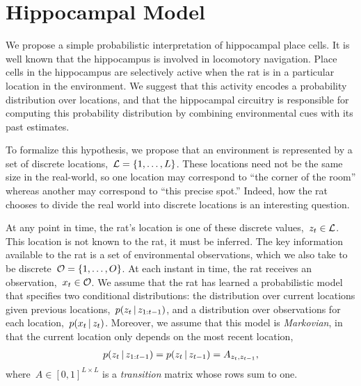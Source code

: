 \section{Hippocampal Model}
We propose a simple probabilistic interpretation of hippocampal place cells.
It is well known that the hippocampus is involved in locomotory navigation.
Place cells in the hippocampus are selectively active when the rat is 
in a particular location in the environment. We suggest that this activity 
encodes a probability distribution over locations, and that the hippocampal 
circuitry is responsible for computing this probability distribution by 
combining environmental cues with its past estimates. 

To formalize this hypothesis, we propose that an environment is represented 
by a set of discrete locations,~${\mathcal{L} = \{1, \ldots, L\}}$. These locations 
need not be the same size in the real-world, so one location may correspond to
``the corner of the room'' whereas another may correspond to ``this precise 
spot.'' Indeed, how the rat chooses to divide the real world into discrete 
locations is an interesting question.

At any point in time, 
the rat's location is one of these discrete values,~${z_t \in \mathcal{L}}$. 
This location is not known to the rat, it must be inferred. 
The key information available to the rat is a set of environmental observations,
which we also take to be discrete~${\mathcal{O} = \{1, \ldots, O\}}$. At 
each instant in time, the rat receives an observation,~${x_t \in \mathcal{O}}$. 
We assume that the rat has learned a probabilistic model that specifies 
two conditional distributions: the distribution over current locations given 
previous locations,~${p(z_{t} \,|\, z_{1:t-1})}$, and a distribution over observations 
for each location,~${p(x_t \,|\, z_{t})}$. Moreover, we assume that this 
model is \emph{Markovian}, in that the current location only depends 
on the most recent location,
\begin{align}
p(z_t \,|\, z_{1:t-1}) = p(z_t \,|\, z_{t-1}) = A_{z_t, z_{t-1}},
\end{align}
where~$A \in [0,1]^{L \times L}$ is a \emph{transition} matrix whose rows sum to one.


